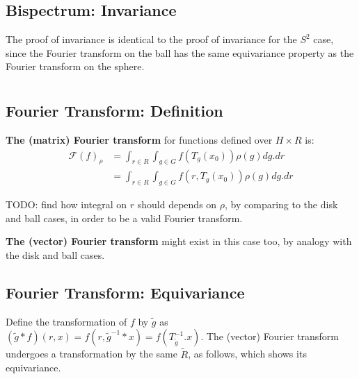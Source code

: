 \documentclass{article}
\begin{document}
\subsection{Bispectrum: Invariance}

The proof of invariance is identical to the proof of invariance for the $S^2$ case, since the Fourier transform on the ball has the same equivariance property as the Fourier transform on the sphere.

\section{\color{deepred}{Domain $\Omega = (H \times R,~G,~\ast)$ (homogeneous $\times$ invariant space)}}

\subsection{Fourier Transform: Definition}


\textbf{The (matrix) Fourier transform} for functions defined over $H \times R$ is:
\begin{align*}
  \mathcal{F}(f)_{\rho}
    &= \int_{r \in R} \int_{g \in G} f\left(T_g(x_0)\right) \rho(g)dg. dr \\
    &= \int_{r \in R} \int_{g \in G} f\left(r, T_g(x_0)\right) \rho(g)dg. dr
\end{align*}

TODO: find how integral on $r$ should depends on $\rho$, by comparing to the disk and ball cases, in order to be a valid Fourier transform.

\textbf{The (vector) Fourier transform} might exist in this case too, by analogy with the disk and ball cases.

\subsection{Fourier Transform: Equivariance}

Define the transformation of $f$ by $\tilde g$ as $(\tilde{g} \ast f)(r, x) = f(r, \tilde g^{-1} \ast x) = f(T_{\tilde g}^{-1}.x)$. The (vector) Fourier transform undergoes a transformation by the same $\tilde R$, as follows, which shows its equivariance.
\end{document}
